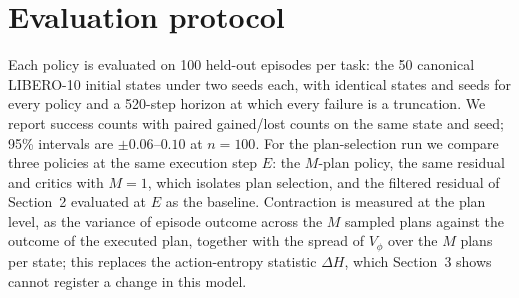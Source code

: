 \documentclass[10pt,twocolumn]{article}
\begin{document}
\section{Evaluation protocol}

Each policy is evaluated on 100 held-out episodes per task: the 50 canonical LIBERO-10 initial states under two seeds each, with identical states and seeds for every policy and a 520-step horizon at which every failure is a truncation. We report success counts with paired gained/lost counts on the same state and seed; 95\% intervals are $\pm 0.06$--$0.10$ at $n = 100$. For the plan-selection run we compare three policies at the same execution step $E$: the $M$-plan policy, the same residual and critics with $M = 1$, which isolates plan selection, and the filtered residual of Section~2 evaluated at $E$ as the baseline. Contraction is measured at the plan level, as the variance of episode outcome across the $M$ sampled plans against the outcome of the executed plan, together with the spread of $V_\phi$ over the $M$ plans per state; this replaces the action-entropy statistic $\Delta H$, which Section~3 shows cannot register a change in this model.
\end{document}
